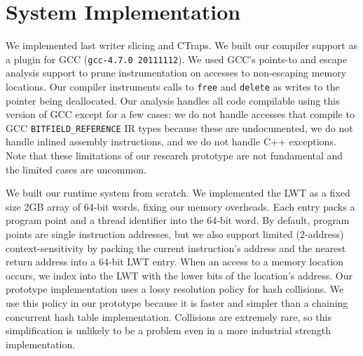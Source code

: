 \documentclass[preprint,9pt]{sigplanconf}
\newcommand{\ctraps}{CTraps\xspace}
\begin{document}

\section{System Implementation}

We implemented last writer slicing and \ctraps.  We built our compiler support
as a plugin for GCC ({\tt gcc-4.7.0 20111112}).  We used GCC's points-to and
escape analysis support to prune instrumentation on accesses to non-escaping memory
locations.  Our compiler instruments calls to {\tt free} and {\tt delete} as
writes to the pointer being deallocated.  Our analysis handles all code
compilable using this version of GCC except for a few cases: we do not handle
accesses that compile to GCC {\tt BITFIELD\_REFERENCE} IR types because these
are undocumented, we do not handle inlined assembly instructions, and we do not
handle C++ exceptions.  Note that these limitations of our research prototype
are not fundamental and the limited cases are uncommon.   

We built our runtime system from scratch.  We implemented the LWT as a fixed
size 2GB array of 64-bit words, fixing our memory overheads.  Each entry packs a program point and a thread
identifier into the 64-bit word.  By default, program points are single
instruction addresses, but we also support limited (2-address)
context-sensitivity by packing the current instruction's address and the
nearest return address into a 64-bit LWT entry. When an access to a memory
location occurs, we index into the LWT with the lower bits of the location's
address.  Our prototype implementation uses a lossy resolution policy for hash
collisions.  We use this policy in our prototype because it is faster and
simpler than a chaining concurrent hash table implementation.  Collisions are
extremely rare, so this simplification is unlikely to be a problem even in a
more industrial strength implementation.  
\end{document}
